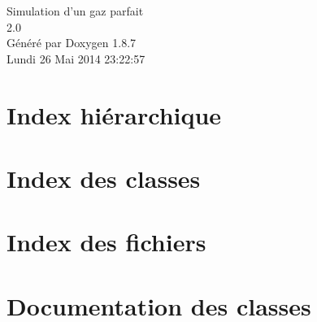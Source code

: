 \documentclass[twoside]{book}
\newcommand{\+}{\discretionary{\mbox{\scriptsize$\hookleftarrow$}}{}{}}
\newcommand{\clearemptydoublepage}{%
  \newpage{\pagestyle{empty}\cleardoublepage}%
}
\begin{document}
\begin{titlepage}
\vspace*{7cm}
\begin{center}%
{\Large Simulation d'un gaz parfait \\[1ex]\large 2.\+0 }\\
\vspace*{1cm}
{\large Généré par Doxygen 1.8.7}\\
\vspace*{0.5cm}
{\small Lundi 26 Mai 2014 23:22:57}\\
\end{center}
\end{titlepage}
\clearemptydoublepage
\tableofcontents
\clearemptydoublepage
{}

\chapter{Index hiérarchique}

\chapter{Index des classes}

\chapter{Index des fichiers}

\chapter{Documentation des classes}




















\end{document}
